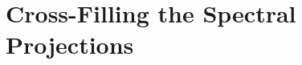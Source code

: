 \documentclass[10pt]{beamer}
\theoremstyle{definition}
\begin{document}
\section{Cross-Filling the Spectral Projections}
\end{document}
